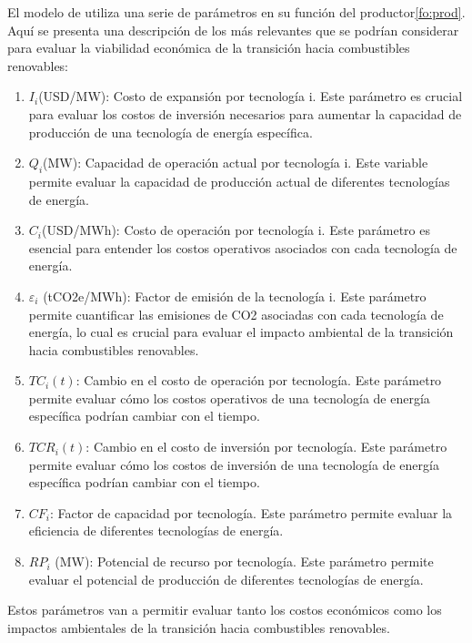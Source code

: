 El modelo de  utiliza una serie de parámetros en su función del productor\ref{fo:prod}. Aquí se presenta una descripción de los más relevantes que se podrían considerar para evaluar la viabilidad económica de la transición hacia combustibles renovables:
\begin{enumerate}

\item 
$I_i$(USD/MW): Costo de expansión por tecnología i. Este parámetro es crucial para evaluar los costos de inversión necesarios para aumentar la capacidad de producción de una tecnología de energía específica.
\item 
$Q_i$(MW): Capacidad de operación actual por tecnología i. Este variable permite evaluar la capacidad de producción actual de diferentes tecnologías de energía.
\item 
$C_i$(USD/MWh): Costo de operación por tecnología i. Este parámetro es esencial para entender los costos operativos asociados con cada tecnología de energía.
\item 

$\varepsilon_{i}$ (tCO2e/MWh): Factor de emisión de la tecnología i. Este parámetro permite cuantificar las emisiones de CO2 asociadas con cada tecnología de energía, lo cual es crucial para evaluar el impacto ambiental de la transición hacia combustibles renovables.
\item 
$TC_i(t)$: Cambio en el costo de operación por tecnología. Este parámetro permite evaluar cómo los costos operativos de una tecnología de energía específica podrían cambiar con el tiempo.
\item 
$TCR_i(t)$: Cambio en el costo de inversión por tecnología. Este parámetro permite evaluar cómo los costos de inversión de una tecnología de energía específica podrían cambiar con el tiempo.
\item 
$CF_i$: Factor de capacidad por tecnología. Este parámetro permite evaluar la eficiencia de diferentes tecnologías de energía.
\item 
$RP_i$ (MW): Potencial de recurso por tecnología. Este parámetro permite evaluar el potencial de producción de diferentes tecnologías de energía.
\end{enumerate}

Estos parámetros van a permitir evaluar tanto los costos económicos como los impactos ambientales de la transición hacia combustibles renovables.





